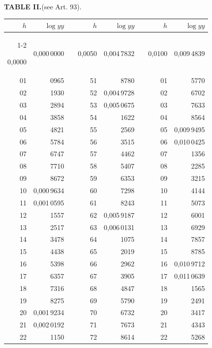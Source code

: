 \clearpage
{}
\begingroup
\centering
\fontsize{9}{9}\selectfont
\setlength{\tabcolsep}{8pt}
\renewcommand{\arraystretch}{1}
\setlength{\parskip}{0pt}
\textbf{TABLE II.}\quad (see Art. 93).
\par\vspace{7pt}
\begin{tabular}{|r|r|@{}p{9pt}@{}|r|r|@{}p{9pt}@{}|r|r|}
\hline
\rule{0pt}{8.5pt}\(h\) & \(\log yy\) & & \(h\) & \(\log yy\) & & \(h\) & \(\log yy\) \\
\cline{1-2}\cline{4-5}\cline{7-8}
\rule{0pt}{8.5pt}0,0000 & 0,000\,0000 &  & 0,0050 & 0,004\,7832 &  & 0,0100 & 0,009\,4839 \\
01 & 0965 &  & 51 & 8780 &  & 01 & 5770 \\
02 & 1930 &  & 52 & 0,004\,9728 &  & 02 & 6702 \\
03 & 2894 &  & 53 & 0,005\,0675 &  & 03 & 7633 \\
04 & 3858 &  & 54 & 1622 &  & 04 & 8564 \\
05 & 4821 &  & 55 & 2569 &  & 05 & 0,009\,9495 \\[3pt]
06 & 5784 &  & 56 & 3515 &  & 06 & 0,010\,0425 \\
07 & 6747 &  & 57 & 4462 &  & 07 & 1356 \\
08 & 7710 &  & 58 & 5407 &  & 08 & 2285 \\
09 & 8672 &  & 59 & 6353 &  & 09 & 3215 \\
10 & 0,000\,9634 &  & 60 & 7298 &  & 10 & 4144 \\[3pt]
11 & 0,001\,0595 &  & 61 & 8243 &  & 11 & 5073 \\
12 & 1557 &  & 62 & 0,005\,9187 &  & 12 & 6001 \\
13 & 2517 &  & 63 & 0,006\,0131 &  & 13 & 6929 \\
14 & 3478 &  & 64 & 1075 &  & 14 & 7857 \\
15 & 4438 &  & 65 & 2019 &  & 15 & 8785 \\[3pt]
16 & 5398 &  & 66 & 2962 &  & 16 & 0,010\,9712 \\
17 & 6357 &  & 67 & 3905 &  & 17 & 0,011\,0639 \\
18 & 7316 &  & 68 & 4847 &  & 18 & 1565 \\
19 & 8275 &  & 69 & 5790 &  & 19 & 2491 \\
20 & 0,001\,9234 &  & 70 & 6732 &  & 20 & 3417 \\[3pt]
21 & 0,002\,0192 &  & 71 & 7673 &  & 21 & 4343 \\
22 & 1150 &  & 72 & 8614 &  & 22 & 5268 \\

\end{tabular}
